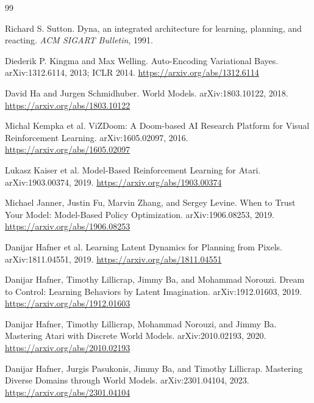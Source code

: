 \documentclass[11pt,a4paper]{ctexart}
\begin{document}
\begin{thebibliography}{99}

Richard S. Sutton.
\newblock Dyna, an integrated architecture for learning, planning, and reacting.
\newblock \emph{ACM SIGART Bulletin}, 1991.

Diederik P. Kingma and Max Welling.
\newblock Auto-Encoding Variational Bayes.
\newblock arXiv:1312.6114, 2013; ICLR 2014.
\newblock \url{https://arxiv.org/abs/1312.6114}

David Ha and Jurgen Schmidhuber.
\newblock World Models.
\newblock arXiv:1803.10122, 2018.
\newblock \url{https://arxiv.org/abs/1803.10122}

Michal Kempka et al.
\newblock ViZDoom: A Doom-based AI Research Platform for Visual Reinforcement Learning.
\newblock arXiv:1605.02097, 2016.
\newblock \url{https://arxiv.org/abs/1605.02097}

Lukasz Kaiser et al.
\newblock Model-Based Reinforcement Learning for Atari.
\newblock arXiv:1903.00374, 2019.
\newblock \url{https://arxiv.org/abs/1903.00374}

Michael Janner, Justin Fu, Marvin Zhang, and Sergey Levine.
\newblock When to Trust Your Model: Model-Based Policy Optimization.
\newblock arXiv:1906.08253, 2019.
\newblock \url{https://arxiv.org/abs/1906.08253}

Danijar Hafner et al.
\newblock Learning Latent Dynamics for Planning from Pixels.
\newblock arXiv:1811.04551, 2019.
\newblock \url{https://arxiv.org/abs/1811.04551}

Danijar Hafner, Timothy Lillicrap, Jimmy Ba, and Mohammad Norouzi.
\newblock Dream to Control: Learning Behaviors by Latent Imagination.
\newblock arXiv:1912.01603, 2019.
\newblock \url{https://arxiv.org/abs/1912.01603}

Danijar Hafner, Timothy Lillicrap, Mohammad Norouzi, and Jimmy Ba.
\newblock Mastering Atari with Discrete World Models.
\newblock arXiv:2010.02193, 2020.
\newblock \url{https://arxiv.org/abs/2010.02193}

Danijar Hafner, Jurgis Pasukonis, Jimmy Ba, and Timothy Lillicrap.
\newblock Mastering Diverse Domains through World Models.
\newblock arXiv:2301.04104, 2023.
\newblock \url{https://arxiv.org/abs/2301.04104}


\end{thebibliography}
\end{document}
